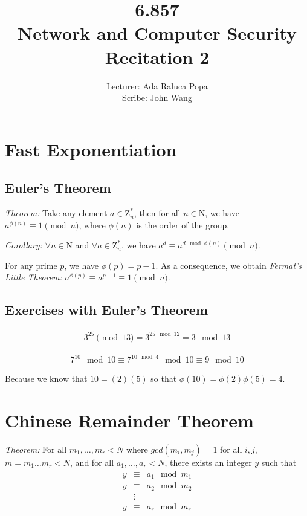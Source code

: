 \documentclass[psamsfonts]{amsart}
\title{6.857 \\
Network and Computer Security \\
Recitation 2}
\author{Lecturer: Ada Raluca Popa\\
Scribe: John Wang}
\begin{document}
\maketitle

\section{Fast Exponentiation}

\subsection{Euler's Theorem}

\emph{Theorem:} Take any element $a \in \mathrm{Z}_{n}^*$, then for all $n \in \mathrm{N}$, we have $a^{\phi(n)} \equiv 1 \pmod{n}$, where $\phi(n)$ is the order of the group.

\emph{Corollary:} $\forall n \in \mathrm{N}$ and $\forall a \in \mathrm{Z}_n^*$, we have $a^{d} \equiv a ^{d \mod \phi(n)} \pmod{n}$. 

For any prime $p$, we have $\phi(p) = p -1$. As a consequence, we obtain \emph{Fermat's Little Theorem:} $a^{\phi(p)} \equiv a^{p-1} \equiv 1 \pmod{n}$. 

\subsection{Exercises with Euler's Theorem}

\begin{eqnarray}
3^{25} \pmod{13} = 3^{25 \mod 12} = 3 \mod{13}
\end{eqnarray}

\begin{eqnarray}
7^10 \mod{10} \equiv 7^{10 \mod{4}} \mod{10} \equiv 9 \mod{10}
\end{eqnarray}

Because we know that $10 = (2)(5)$ so that $\phi(10) = \phi(2) \phi(5) = 4$. 

\section{Chinese Remainder Theorem}

\emph{Theorem:} For all $m_1, \ldots, m_r < N$ where $gcd(m_i, m_j) = 1$ for all $i,j$, $m = m_1 \ldots m_r < N$, and for all $a_1, \ldots, a_r< N$, there exists an integer $y$ such that
\begin{eqnarray}
  y &\equiv& a_1 \mod{m_1} \\
  y &\equiv& a_2 \mod{m_2} \\
    &\vdots& \\
  y &\equiv& a_r \mod{m_r}
\end{eqnarray}
\end{document}
